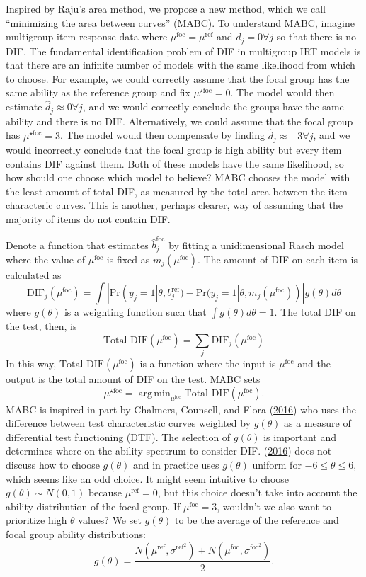 \documentclass[
  11pt,
]{article}
\begin{document}
Inspired by Raju's area method, we propose a new method, which we call \enquote{minimizing the area between curves} (MABC). To understand MABC, imagine multigroup item response data where \(\mu^{\text{foc}} = \mu^{\text{ref}}\) and \(d_j = 0 \forall j\) so that there is no DIF. The fundamental identification problem of DIF in multigroup IRT models is that there are an infinite number of models with the same likelihood from which to choose. For example, we could correctly assume that the focal group has the same ability as the reference group and fix \(\mu^{\star\text{foc}} = 0\). The model would then estimate \(\hat d_j \approx 0 \forall j\), and we would correctly conclude the groups have the same ability and there is no DIF. Alternatively, we could assume that the focal group has \(\mu^{\star\text{foc}} = 3\). The model would then compensate by finding \(\hat d_j \approx -3 \forall j\), and we would incorrectly conclude that the focal group is high ability but every item contains DIF against them. Both of these models have the same likelihood, so how should one choose which model to believe? MABC chooses the model with the least amount of total DIF, as measured by the total area between the item characteric curves. This is another, perhaps clearer, way of assuming that the majority of items do not contain DIF.

Denote a function that estimates \(\hat b_j^\text{foc}\) by fitting a unidimensional Rasch model where the value of \(\mu^\text{foc}\) is fixed as \(m_j(\mu^\text{foc})\). The amount of DIF on each item is calculated as
\[
\text{DIF}_j(\mu^\text{foc}) = \int |\text{Pr}(y_j = 1| \theta, b_j^{\text{ref}}) - \text{Pr}(y_j = 1| \theta, m_j(\mu^\text{foc}))| g(\theta)d\theta
\]
where \(g(\theta)\) is a weighting function such that \(\int g(\theta)d\theta = 1\). The total DIF on the test, then, is
\[
\text{Total DIF}(\mu^\text{foc}) = \sum_{j} \text{DIF}_j(\mu^\text{foc})
\]
In this way, \(\text{Total DIF}(\mu^\text{foc})\) is a function where the input is \(\mu^\text{foc}\) and the output is the total amount of DIF on the test. MABC sets
\[
\mu^{\star\text{foc}} = \mathop\mathrm{arg\,min}_{\mu^\text{foc}} \text{Total DIF}(\mu^\text{foc}).
\]
MABC is inspired in part by Chalmers, Counsell, and Flora (\protect\hyperlink{ref-chalmers2016might}{2016}) who uses the difference between test characteristic curves weighted by \(g(\theta)\) as a measure of differential test functioning (DTF). The selection of \(g(\theta)\) is important and determines where on the ability spectrum to consider DIF. (\protect\hyperlink{ref-chalmers2016might}{2016}) does not discuss how to choose \(g(\theta)\) and in practice uses \(g(\theta)\) uniform for \(-6 \le \theta \le 6\), which seems like an odd choice. It might seem intuitive to choose \(g(\theta) \sim N(0, 1)\) because \(\mu^\text{ref} = 0\), but this choice doesn't take into account the ability distribution of the focal group. If \(\mu^\text{foc} = 3\), wouldn't we also want to prioritize high \(\theta\) values? We set \(g(\theta)\) to be the average of the reference and focal group ability distributions:
\[
g(\theta) = \dfrac{N(\mu^{\text{ref}}, \sigma^{\text{ref}^2}) + N(\mu^{\text{foc}}, \sigma^{\text{foc}^2})}{2}.
\]
\end{document}
